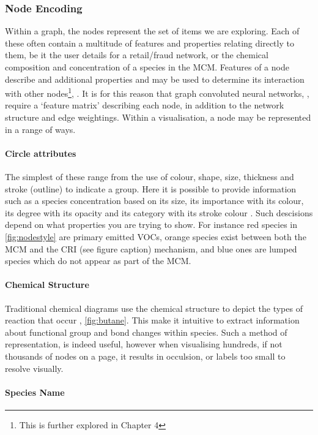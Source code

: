 \subsubsection{Node Encoding}
Within a graph, the nodes represent the set of items we are exploring. Each of these often contain a multitude of features and properties relating directly to them, be it the user details for a retail/fraud network, or the chemical composition and concentration of a species in the MCM. Features of a node describe and additional properties and may be used to determine its interaction with other nodes\footnote{This is further explored in Chapter 4}, \cite{protocol}. It is for this reason that graph convoluted neural networks, \cite{t2gcn}, require a  `feature matrix' describing each node, in addition to the network structure and edge weightings. Within a visualisation, a node may be represented in a range of ways. 

\paragraph*{\color{c4}Circle attributes}



The simplest of these range from the use of colour, shape, size, thickness and stroke (outline) to indicate a group. Here it is possible to provide information such as a species concentration based on its size, its importance with its colour, its degree with its opacity and its category with its stroke colour \cite{brightness,colour}. Such descisions depend on what properties you are trying to show. For instance red species in \autoref{fig:nodestyle} are primary emitted VOCs, orange species exist between both the MCM and the CRI (see figure caption) mechanism, and blue ones are lumped species which do not appear as part of the MCM.  


\paragraph*{\color{c1}Chemical Structure}
Traditional chemical diagrams use the chemical structure to depict the types of reaction that occur , \autoref{fig:butane}. This make it intuitive to extract information about functional group and bond changes within species. Such a method of representation, is indeed useful, however when visualising hundreds, if not thousands of nodes on a page, it results in occulsion, or labels too small to resolve visually. 

\paragraph*{\color{c2}Species Name}

